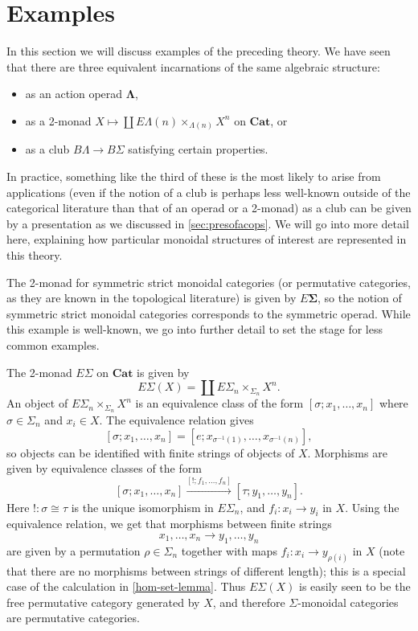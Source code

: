 \documentclass{amsbook} %
\newcommand{\mb}{\mathbf}
\numberwithin{section}{chapter}
\begin{document}
\section{Examples}\label{sec:examples}

In this section we will discuss examples of the preceding theory.  We have seen that there are three equivalent incarnations of the same algebraic structure:
\begin{itemize}
\item as an action operad $\mb{\Lambda}$,
\item as a 2-monad $X \mapsto \coprod E\Lambda(n) \times_{\Lambda(n)} X^{n}$ on $\mb{Cat}$, or
\item as a club $B\Lambda \rightarrow B\Sigma$ satisfying certain properties.
\end{itemize}
In practice, something like the third of these is the most likely to arise from applications (even if the notion of a club is perhaps less well-known outside of the categorical literature than that of an operad or a 2-monad) as a club can be given by a presentation as we discussed in \cref{sec:presofacops}.  We will go into more detail here, explaining how particular monoidal structures of interest are represented in this theory.


\begin{example}
The 2-monad for symmetric strict monoidal categories (or permutative categories, as they are known in the topological literature) is given by $E \mb{\Sigma}$, so the notion of symmetric strict monoidal categories corresponds to the symmetric operad.  While this example is well-known, we go into further detail to set the stage for less common examples.

The 2-monad $E\Sigma$ on $\mb{Cat}$ is given by
  \[
    E\Sigma (X) = \coprod E\Sigma_{n} \times_{\Sigma_{n}} X^{n}.
  \]
An object of $E\Sigma_{n} \times_{\Sigma_{n}} X^{n}$ is an equivalence class of the form $[\sigma; x_{1}, \ldots, x_{n}]$ where $\sigma \in \Sigma_{n}$ and $x_{i} \in X$.  The equivalence relation gives
  \[
    [\sigma; x_{1}, \ldots, x_{n}] = \left[e; x_{\sigma^{-1}(1)}, \ldots, x_{\sigma^{-1}(n)}\right],
  \]
so objects can be identified with finite strings of objects of $X$.  Morphisms are given by equivalence classes of the form
  \[
    [\sigma; x_{1}, \ldots, x_{n}] \stackrel{[!; f_{1}, \ldots, f_{n}]}{\longrightarrow} [\tau; y_{1}, \ldots, y_{n}].
  \]
Here $! \colon \sigma \cong \tau$ is the unique isomorphism in $E \Sigma_{n}$, and $f_{i} \colon x_{i} \rightarrow y_{i}$ in $X$.  Using the equivalence relation, we get that morphisms between finite strings
  \[
    x_{1}, \ldots, x_{n} \rightarrow y_{1}, \ldots, y_{n}
  \]
are given by a permutation $\rho \in \Sigma_{n}$ together with maps $f_{i} \colon x_{i} \rightarrow y_{\rho(i)}$ in $X$ (note that there are no morphisms between strings of different length); this is a special case of the calculation in \ref{hom-set-lemma}.  Thus $E \Sigma(X)$ is easily seen to be the free permutative category generated by $X$, and therefore $\Sigma$-monoidal categories are permutative categories.
\end{example}
\end{document}
